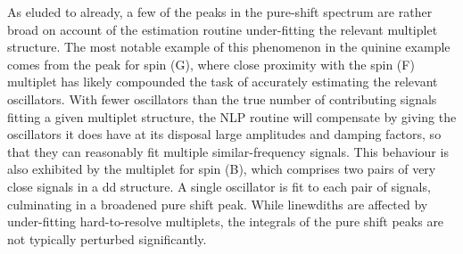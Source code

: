 As eluded to already, a few of the peaks in the pure-shift spectrum are rather
broad on account of the estimation routine under-fitting the relevant multiplet
structure. The most notable example of this phenomenon in the quinine example
comes from the peak for spin (G), where close proximity with the spin (F)
multiplet has likely compounded the task of accurately estimating the relevant
oscillators. With fewer oscillators than the true number of contributing signals
fitting a given multiplet structure, the \ac{NLP} routine will compensate by
giving the oscillators it does have at its disposal large amplitudes and
damping factors, so that they can reasonably fit multiple similar-frequency
signals. This behaviour is also exhibited by the multiplet for spin (B),
which comprises two pairs of very close signals in a dd structure. A single
oscillator is fit to each pair of signals, culminating in a broadened pure
shift peak. While linewdiths are affected by under-fitting hard-to-resolve
multiplets, the integrals of the pure shift peaks are not typically perturbed
significantly. 

